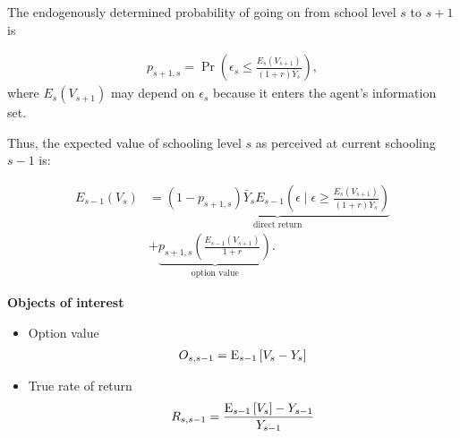 \begin{frame}
The endogenously determined probability of going on from school level $s$ to $s + 1$ is

\begin{align*}
p_{s + 1, s} = \Pr\left(\epsilon_s \leq \frac{E_s(V_{s + 1})}{(1 + r) \bar{Y}_s}\right),
\end{align*}
where $E_s(V_{s + 1})$ may depend on $\epsilon_s$ because it enters the agent's information set.
\end{frame}
\begin{frame}
Thus, the expected value of schooling level $s$ as perceived at current schooling $s-1$ is:

\begin{align*}
E_{s - 1}(V_s) & = \underbrace{(1 - p_{s + 1, s}) \bar{Y}_s E_{s - 1}\left(\epsilon\mid \epsilon \ge \frac{E_s(V_{s + 1})}{(1 + r)\bar{Y}_s}\right)}_{\text{direct return}} \\
 & + \underbrace{p_{s + 1, s} \left(\frac{E_{s - 1}(V_{s + 1})}{1 + r}\right)}_{\text{option value}}.
\end{align*}
\end{frame}
\begin{frame}\textbf{Objects of interest}\vspace{0.3cm}

\begin{itemize}
\item Option value
\begin{align*}
O_{s, s - 1} = \mathrm{E}_{s - 1}\left[V_s - Y_s\right]\\
\end{align*}
\item True rate of return
\begin{align*}
R_{s, s - 1} = \frac{\mathrm{E}_{s - 1}\left[V_s\right] - Y_{s - 1}}{Y_{s -1}}
\end{align*}
\end{itemize}
\end{frame}
